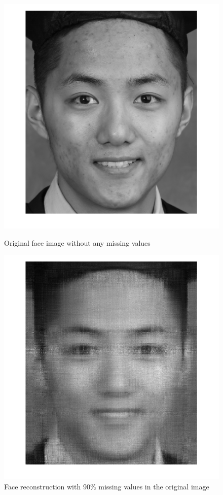 \documentclass[11pt]{article} %
\begin{document}
\begin{figure}[!htb]
  \includegraphics[width=\linewidth]{mySelfieOriginal.png}
  \caption{Original face image without any missing values}\label{fig:selfie1}
\endminipage\hfill
{}%
  \includegraphics[width=\linewidth]{mySelfie90M100R.png}
  \caption{Face reconstruction with 90$\%$ missing values in the original image}\label{fig:siefie3}
\endminipage
\end{figure}
\end{document}
